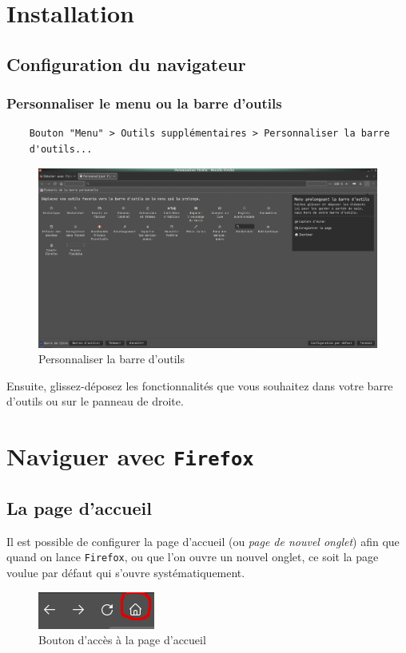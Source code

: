 \documentclass[a4paper,11pt]{book}
\begin{document}
\mainmatter
\chapter{Installation}
\section{Configuration du navigateur}
\subsection*{Personnaliser le menu ou la barre d'outils}\label{barre_outils}
\begin{verbatim}
    Bouton "Menu" > Outils supplémentaires > Personnaliser la barre 
    d'outils...
\end{verbatim}
\medskip

\begin{figure}[h]
\begin{center}
\includegraphics[scale=0.2]{IMG/003--Ecran.png}
\caption{Personnaliser la barre d'outils}
\end{center}
\end{figure}
\medskip

Ensuite, glissez-déposez les fonctionnalités que vous souhaitez dans votre barre d’outils ou sur le panneau de droite. 
\medskip



\chapter{Naviguer avec \texttt{Firefox}}
\section{La page d'accueil}
Il est possible de configurer la page d'accueil (ou \textit{page de nouvel onglet}) afin que quand on lance \texttt{Firefox}, ou que l'on ouvre un nouvel onglet, ce soit la page voulue par défaut qui s'ouvre systématiquement.
\begin{figure}[h]
\begin{center}
\includegraphics[scale=0.5]{IMG/001--Bouton_accueil.png}
\caption{Bouton d'accès à la page d'accueil}
\end{center}
\end{figure}
\medskip
\end{document}
